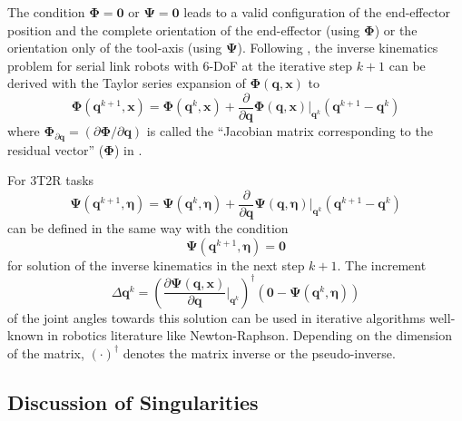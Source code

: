 \documentclass{svproc}
\newcommand{\bm}[1]{\boldsymbol{#1}}
\begin{document}
The condition $\bm{\Phi}=\bm{0}$ or $\bm{\Psi}=\bm{0}$ leads to a valid configuration of the end-effector position and the complete orientation of the end-effector (using $\bm{\Phi}$) or the orientation only of the tool-axis (using $\bm{\Psi}$).
Following \cite{GoldenbergBenFen1985}, the inverse kinematics problem for serial link robots with 6-DoF at the iterative step $k+1$ can be derived with the Taylor series expansion of $\bm{\Phi}(\bm{q},\bm{x})$ to
%
\begin{equation}
\bm{\Phi}(\bm{q}^{k+1},\bm{x}) = 
\bm{\Phi}(\bm{q}^{k},\bm{x})
+
\frac{\partial}{\partial \bm{q}} \bm{\Phi}(\bm{q},\bm{x}) \biggr\rvert_{\bm{q}^k} (\bm{q}^{k+1} - \bm{q}^k)
\label{equ:taylor_phi}
\end{equation}
%
where $\bm{\Phi}_{\partial\bm{q}}=(\partial \bm{\Phi} / \partial \bm{q})$ is called the ``Jacobian matrix corresponding to the residual vector'' ($\bm{\Phi}$) in \cite{GoldenbergBenFen1985}.

For 3T2R tasks
%
\begin{equation}
\bm{\Psi}(\bm{q}^{k+1},\bm{\eta}) = 
\bm{\Psi}(\bm{q}^{k},\bm{\eta})
+
\frac{\partial}{\partial \bm{q}} \bm{\Psi}(\bm{q},\bm{\eta}) \biggr\rvert_{\bm{q}^k} (\bm{q}^{k+1} - \bm{q}^k)
\label{equ:taylor_psi}
\end{equation}
%
can be defined in the same way with the condition
%
\begin{equation}
\bm{\Psi}(\bm{q}^{k+1},\bm{\eta})=\bm{0}
\end{equation}
%
for solution of the inverse kinematics in the next step $k+1$. The increment 
%
\begin{equation}
\Delta \bm{q}^k
=
\left(\frac{\partial \bm{\Psi}(\bm{q},\bm{x})}{\partial \bm{q}}\biggr\rvert_{\bm{q}^k}\right)^{\dagger}
(\bm{0} - \bm{\Psi}(\bm{q}^{k},\bm{\eta}))
\label{equ:deltaq_psi}
\end{equation}
%
of the joint angles towards this solution can be used in iterative algorithms well-known in robotics literature like Newton-Raphson.
Depending on the dimension of the matrix, $(\cdot)^\dagger$ denotes the matrix inverse or the pseudo-inverse.

\subsection{Discussion of Singularities}
\end{document}
